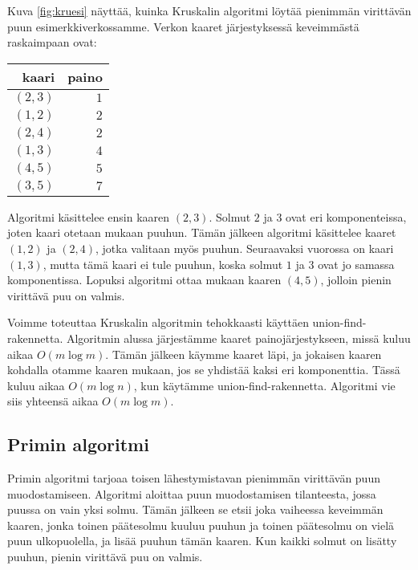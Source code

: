 Kuva \ref{fig:kruesi} näyttää, kuinka Kruskalin algoritmi löytää pienimmän virittävän
puun esimerkkiverkossamme.
Verkon kaaret järjestyksessä keveim\-mästä raskaimpaan ovat:

\begin{center}
\begin{tabular}{rr}
kaari & paino \\
\hline
$(2,3)$ & $1$ \\
$(1,2)$ & $2$ \\
$(2,4)$ & $2$ \\
$(1,3)$ & $4$ \\
$(4,5)$ & $5$ \\
$(3,5)$ & $7$ \\
\end{tabular}
\end{center}

Algoritmi käsittelee ensin kaaren $(2,3)$.
Solmut $2$ ja $3$ ovat eri komponenteissa,
joten kaari otetaan mukaan puuhun.
Tämän jälkeen algoritmi käsittelee kaaret $(1,2)$ ja $(2,4)$,
jotka valitaan myös puuhun.
Seuraavaksi vuorossa on kaari $(1,3)$,
mutta tämä kaari ei tule puuhun,
koska solmut $1$ ja $3$ ovat jo samassa komponentissa.
Lopuksi algoritmi ottaa mukaan kaaren $(4,5)$,
jolloin pienin virittävä puu on valmis.

Voimme toteuttaa Kruskalin algoritmin tehokkaasti
käyttäen union-find-rakennetta.
Algoritmin alussa järjestämme kaaret painojärjestykseen,
missä kuluu aikaa $O(m \log m)$.
Tämän jälkeen käymme kaaret läpi, ja jokaisen kaaren
kohdalla otamme kaaren mukaan, jos se yhdistää kaksi eri komponenttia.
Tässä kuluu aikaa $O(m \log n)$,
kun käytämme union-find-rakennetta.
Algoritmi vie siis yhteensä aikaa $O(m \log m)$.

\subsection{Primin algoritmi}

Primin algoritmi tarjoaa toisen lähestymistavan
pienimmän virittävän puun muodostamiseen.
Algoritmi aloittaa puun muodostamisen tilanteesta,
jossa puussa on vain yksi solmu.
Tämän jälkeen se etsii joka vaiheessa keveimmän kaaren,
jonka toinen päätesolmu kuuluu puuhun ja toinen
päätesolmu on vielä puun ulkopuolella, ja lisää puuhun tämän kaaren.
Kun kaikki solmut on lisätty puuhun, pienin virittävä puu on valmis.

